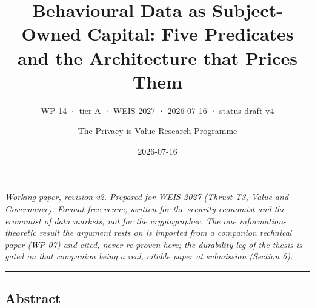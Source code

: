 \documentclass[
  11pt,
]{article}
\title{Behavioural Data as Subject-Owned Capital: Five Predicates and
the Architecture that Prices Them}
\subtitle{WP-14 · tier A · WEIS-2027 · 2026-07-16 · status draft-v4}
\author{The Privacy-is-Value Research Programme}
\date{2026-07-16}
\begin{document}
\maketitle

\emph{Working paper, revision v2. Prepared for WEIS 2027 (Thrust T3,
Value and Governance). Format-free venue; written for the security
economist and the economist of data markets, not for the cryptographer.
The one information-theoretic result the argument rests on is imported
from a companion technical paper (WP-07) and cited, never re-proven
here; the durability leg of the thesis is gated on that companion being
a real, citable paper at submission (Section 6).}

\begin{center}\rule{0.5\linewidth}{0.5pt}\end{center}

\subsection{Abstract}\label{abstract}
\end{document}
